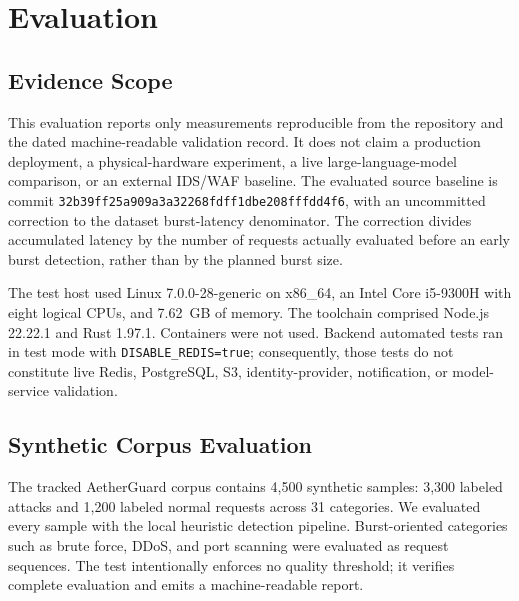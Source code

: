 
\section{Evaluation}
\label{sec:evaluation}

\subsection{Evidence Scope}
\label{subsec:evidence-scope}

This evaluation reports only measurements reproducible from the repository and the dated machine-readable validation record. It does not claim a production deployment, a physical-hardware experiment, a live large-language-model comparison, or an external IDS/WAF baseline. The evaluated source baseline is commit \texttt{32b39ff25a909a3a32268fdff1dbe208fffdd4f6}, with an uncommitted correction to the dataset burst-latency denominator. The correction divides accumulated latency by the number of requests actually evaluated before an early burst detection, rather than by the planned burst size.

The test host used Linux 7.0.0-28-generic on x86\_64, an Intel Core i5-9300H with eight logical CPUs, and 7.62~GB of memory. The toolchain comprised Node.js 22.22.1 and Rust 1.97.1. Containers were not used. Backend automated tests ran in test mode with \texttt{DISABLE\_REDIS=true}; consequently, those tests do not constitute live Redis, PostgreSQL, S3, identity-provider, notification, or model-service validation.

\subsection{Synthetic Corpus Evaluation}
\label{subsec:synthetic-corpus}

The tracked AetherGuard corpus contains 4,500 synthetic samples: 3,300 labeled attacks and 1,200 labeled normal requests across 31 categories. We evaluated every sample with the local heuristic detection pipeline. Burst-oriented categories such as brute force, DDoS, and port scanning were evaluated as request sequences. The test intentionally enforces no quality threshold; it verifies complete evaluation and emits a machine-readable report.

